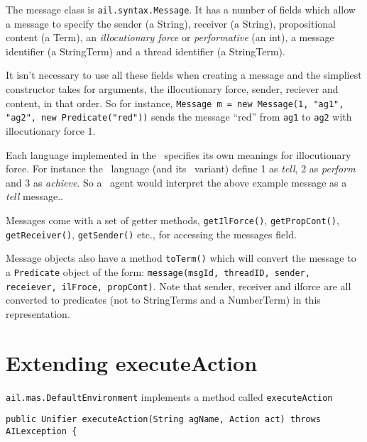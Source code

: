 The message class is \texttt{ail.syntax.Message}.  It has a number of fields which allow a message to specify the sender (a String), receiver (a String), propositional content (a Term), an \emph{illocutionary force} or \emph{performative} (an int), a message identifier (a StringTerm) and a thread identifier (a StringTerm).

It isn't necessary to use all these fields when creating a message and the simpliest constructor takes for arguments, the illocutionary force, sender, reciever and content, in that order.  So for instance, \texttt{Message m = new Message(1, "ag1", "ag2", new Predicate("red"))} sends the message ``red'' from \texttt{ag1} to \texttt{ag2} with illocutionary force 1.

Each language implemented in the \ail\ specifies its own meanings for illocutionary force.  For instance the \gwendolen\ language (and its \eass\ variant) define 1 as \emph{tell}, 2 as \emph{perform} and 3 as \emph{achieve}.  So a \gwendolen\ agent would interpret the above example message as a \emph{tell} message..

Messages come with a set of getter methods, \texttt{getIlForce()}, \texttt{getPropCont()}, \texttt{getReceiver()}, \texttt{getSender()} etc., for accessing the messages field.

Message objects also have a method \texttt{toTerm()} which will convert the message to a \texttt{Predicate} object of the form: \texttt{message(msgId, threadID, sender, receiever, ilFroce, propCont)}.  Note that sender, receiver and ilforce are all converted to predicates (not to StringTerms and a NumberTerm) in this representation.

\section{Extending executeAction}
\texttt{ail.mas.DefaultEnvironment} implements a method called \texttt{executeAction}

\begin{verbatim}
public Unifier executeAction(String agName, Action act) throws AILexception {
\end{verbatim}

